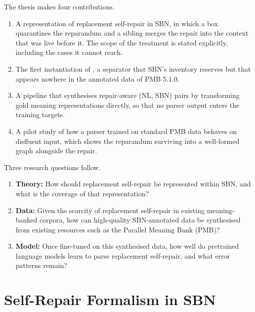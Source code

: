 \documentclass{article}
\begin{document}
The thesis makes four contributions.

\begin{enumerate}[itemsep=0.2em]
  \item A representation of replacement self-repair in SBN, in which a
         box quarantines the reparandum and a sibling
         merges the repair into the context that was live
        before it. The scope of the treatment is stated explicitly, including the
        cases it cannot reach.
  \item The first instantiation of , a separator that SBN's
        inventory reserves but that appears nowhere in the annotated data of
        PMB 5.1.0.
  \item A pipeline that synthesises repair-aware (NL, SBN) pairs by transforming
        gold meaning representations directly, so that no parser output enters the
        training targets.
  \item A pilot study of how a parser trained on standard PMB data behaves on
        disfluent input, which shows the reparandum surviving into a well-formed
        graph alongside the repair.
\end{enumerate}

Three research questions follow.

\begin{enumerate}
  \item \textbf{Theory:} How should replacement self-repair be represented within SBN, and what is the coverage of that representation?
  \item \textbf{Data:} Given the scarcity of replacement self-repair in existing meaning-banked corpora, how can high-quality SBN-annotated data be synthesised from existing resources such as the Parallel Meaning Bank (PMB)?
  \item \textbf{Model:} Once fine-tuned on this synthesised data, how well do pretrained language models learn to parse replacement self-repair, and what error patterns remain?
\end{enumerate}

\section{Self-Repair Formalism in SBN}
\label{sec:formalism}
\end{document}
